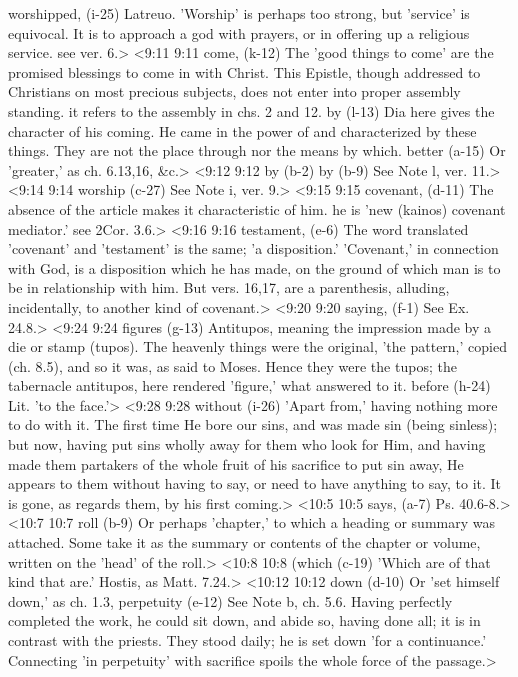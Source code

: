   worshipped, (i-25)  Latreuo. 'Worship' is perhaps too strong, but 'service' is  equivocal. It is to approach a god with prayers, or in offering  up a religious service. see ver. 6.>
<9:11 9:11  come, (k-12)  The 'good things to come' are the promised blessings to come  in with Christ. This Epistle, though addressed to Christians on  most precious subjects, does not enter into proper assembly  standing. it refers to the assembly in chs. 2 and 12.
  by (l-13)  Dia here gives the character of his coming. He came in the  power of and characterized by these things. They are not the  place through nor the means by which.
  better (a-15)  Or 'greater,' as ch. 6.13,16, &c.>
<9:12 9:12  by (b-2)  by (b-9)
  See Note l, ver. 11.>
<9:14 9:14  worship (c-27)  See Note i, ver. 9.>
<9:15 9:15  covenant, (d-11)  The absence of the article makes it characteristic of him. he  is 'new (kainos) covenant mediator.' see 2Cor. 3.6.>
<9:16 9:16  testament, (e-6)  The word translated 'covenant' and 'testament' is the same;  'a disposition.' 'Covenant,' in connection with God, is a  disposition which he has made, on the ground of which man is to  be in relationship with him. But vers. 16,17, are a  parenthesis, alluding, incidentally, to another kind of  covenant.>
<9:20 9:20  saying, (f-1)  See Ex. 24.8.>
<9:24 9:24  figures (g-13)  Antitupos, meaning the impression made by a die or stamp  (tupos). The heavenly things were the original, 'the  pattern,' copied (ch. 8.5), and so it was, as said to Moses.  Hence they were the tupos; the tabernacle antitupos, here  rendered 'figure,' what answered to it.
  before (h-24)  Lit. 'to the face.'>
<9:28 9:28  without (i-26)  'Apart from,' having nothing more to do with it. The first  time He bore our sins, and was made sin (being sinless); but  now, having put sins wholly away for them who look for Him, and  having made them partakers of the whole fruit of his sacrifice  to put sin away, He appears to them without having to say, or  need to have anything to say, to it. It is gone, as regards  them, by his first coming.>
<10:5 10:5  says, (a-7)  Ps. 40.6-8.>
<10:7 10:7  roll (b-9)  Or perhaps 'chapter,' to which a heading or summary was  attached. Some take it as the summary or contents of the  chapter or volume, written on the 'head' of the roll.>
<10:8 10:8  (which (c-19)  'Which are of that kind that are.' Hostis, as Matt. 7.24.>
<10:12 10:12  down (d-10)  Or 'set himself down,' as ch. 1.3,
  perpetuity (e-12)  See Note b, ch. 5.6. Having perfectly completed the work, he  could sit down, and abide so, having done all; it is in  contrast with the priests. They stood daily; he is set down  'for a continuance.' Connecting 'in perpetuity' with sacrifice  spoils the whole force of the passage.>
